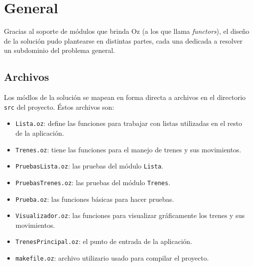 \documentclass[12pt,titlepage]{article}
\begin{document}


\setcounter{page}{1}

\tableofcontents
\newpage



\clearpage	

\setlength{\parindent}{0pt}
\setlength{\parskip}{2ex plus 0.5ex minus 0.2ex}

\hypersetup{
linkcolor=red
}



\section{General}

Gracias al soporte de módulos que brinda Oz (a los que llama {\it functors}), el diseño de la solución pudo plantearse en distintas partes, cada una dedicada a resolver un subdominio del problema general.

\subsection{Archivos}

Los módlos de la solución se mapean en forma directa a archivos en el directorio \verb|src| del proyecto. Éstos archivos son:

\begin{itemize} 
  \item \verb|Lista.oz|: define las funciones para trabajar con listas utilizadas en el resto de la aplicación.
  \item \verb|Trenes.oz|: tiene las funciones para el manejo de trenes y sus movimientos.
  \item \verb|PruebasLista.oz|: las pruebas del módulo \verb|Lista|.
  \item \verb|PruebasTrenes.oz|: las pruebas del módulo \verb|Trenes|.
  \item \verb|Prueba.oz|: las funciones básicas para hacer pruebas.
  \item \verb|Visualizador.oz|: las funciones para visualizar gráficamente los trenes y sus movimientos.
  \item \verb|TrenesPrincipal.oz|: el punto de entrada de la aplicación.
  \item \verb|makefile.oz|: archivo utilizario usado para compilar el proyecto.
\end{itemize}
\end{document}
